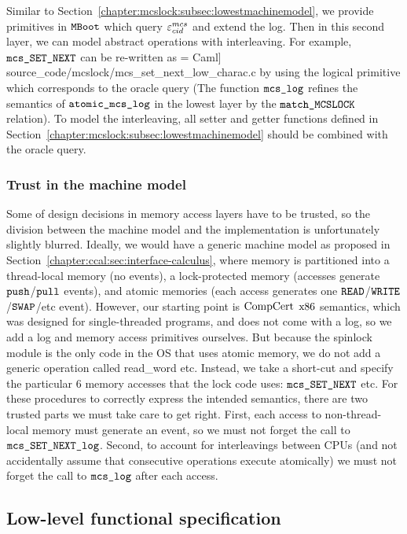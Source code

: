 Similar to Section~\ref{chapter:mcslock:subsec:lowestmachinemodel}, 
we provide primitives in ${\mathrm{\texttt{MBoot}}}$ which query ${\varepsilon}^{mcs}_{cid}$ and extend the log.
Then in this second layer, we can model abstract operations with interleaving.
For example, ${\mathrm{\texttt{mcs\_SET\_NEXT}}}$ can be re-written as
 = Caml] {source_code/mcslock/mcs_set_next_low_charac.c}
by using the logical primitive which corresponds to the oracle query
(The function ${\mathrm{\texttt{mcs\_log}}}$ refines the semantics of ${\mathrm{\texttt{atomic\_mcs\_log}}}$ in the lowest layer by the ${\mathrm{\texttt{match\_MCSLOCK}}}$ relation).
To model the interleaving, all  setter and getter functions defined
in Section~\ref{chapter:mcslock:subsec:lowestmachinemodel} should be combined with the
oracle query.

\subsubsection{Trust in the machine model}
Some of design decisions in  memory access
layers have to be trusted, so the division between the machine model and
the implementation is unfortunately slightly blurred.
Ideally, we would have a generic machine model as proposed in Section~\ref{chapter:ccal:sec:interface-calculus}, where memory is partitioned into a thread-local
memory (no events), a lock-protected memory (accesses generate ${\mathrm{\texttt{push}}}$/${\mathrm{\texttt{pull}}}$
events), and atomic memories (each access
generates one ${\mathrm{\texttt{READ}}}$/${\mathrm{\texttt{WRITE}}}$/${\mathrm{\texttt{SWAP}}}$/etc event).  However, our starting point
is  $\mathrm{CompCert}$ $\mathrm{x86}$ semantics, which was designed for single-threaded
programs, and does not come with a log, so we add a log and memory access
primitives ourselves.
But because the spinlock module is the only code in the OS that uses
atomic memory, we do not add a generic operation called
read\_word etc. Instead, we take a short-cut and specify the particular
6 memory accesses that the lock code uses: ${\mathrm{\texttt{mcs\_SET\_NEXT}}}$ etc.
For these procedures to correctly express the intended semantics,
there are two trusted parts we must take care to get right. First,
each access to non-thread-local memory must generate an event, so we
must not forget the call to
${\mathrm{\texttt{mcs\_SET\_NEXT\_log}}}$.
Second, to account for
interleavings between CPUs (and not accidentally assume that consecutive
operations execute atomically) we must not forget the call to
${\mathrm{\texttt{mcs\_log}}}$ after each access.



\subsection{Low-level functional specification}
\label{chapter:mcslock:subsec:atomicoperation}

